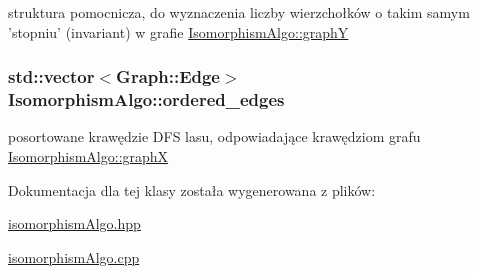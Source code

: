 struktura pomocnicza, do wyznaczenia liczby wierzchołków o takim samym 'stopniu' (invariant) w grafie \hyperlink{classIsomorphismAlgo_a7656ae201d816e62edda60462cdb3a6e}{Isomorphism\-Algo\-::graph\-Y} 

\hypertarget{classIsomorphismAlgo_a0763ab4b07232f8aa9ca80561f353ad1}{
\subsubsection[{ordered\-\_\-edges}]{\setlength{\rightskip}{0pt plus 5cm}std\-::vector$<${\bf Graph\-::\-Edge}$>$ Isomorphism\-Algo\-::ordered\-\_\-edges\hspace{0.3cm}{\ttfamily [private]}}}\label{classIsomorphismAlgo_a0763ab4b07232f8aa9ca80561f353ad1}


posortowane krawędzie D\-F\-S lasu, odpowiadające krawędziom grafu \hyperlink{classIsomorphismAlgo_a78bc7264b0a6a264b0343209b3ca3647}{Isomorphism\-Algo\-::graph\-X} 



Dokumentacja dla tej klasy została wygenerowana z plików\-:\begin{DoxyCompactItemize}
\item 
\hyperlink{isomorphismAlgo_8hpp}{isomorphism\-Algo.\-hpp}\item 
\hyperlink{isomorphismAlgo_8cpp}{isomorphism\-Algo.\-cpp}\end{DoxyCompactItemize}
